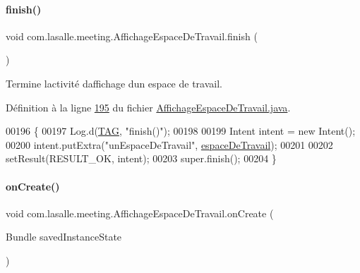 \paragraph{\texorpdfstring{finish()}{finish()}}
{\footnotesize\ttfamily void com.\+lasalle.\+meeting.\+Affichage\+Espace\+De\+Travail.\+finish (\begin{DoxyParamCaption}{ }\end{DoxyParamCaption})}



Termine l\textquotesingle{}activité d\textquotesingle{}affichage d\textquotesingle{}un espace de travail. 



Définition à la ligne \hyperlink{_affichage_espace_de_travail_8java_source_l00195}{195} du fichier \hyperlink{_affichage_espace_de_travail_8java_source}{Affichage\+Espace\+De\+Travail.\+java}.


\begin{DoxyCode}
00196     \{
00197         Log.d(\hyperlink{classcom_1_1lasalle_1_1meeting_1_1_affichage_espace_de_travail_a8606eb11c7b28f52226544de431d86a4}{TAG}, \textcolor{stringliteral}{"finish()"});
00198 
00199         Intent intent = \textcolor{keyword}{new} Intent();
00200         intent.putExtra(\textcolor{stringliteral}{"unEspaceDeTravail"}, \hyperlink{classcom_1_1lasalle_1_1meeting_1_1_affichage_espace_de_travail_a934d41c1c41882b94b65a95cee5aca13}{espaceDeTravail});
00201 
00202         setResult(RESULT\_OK, intent);
00203         super.finish();
00204     \}
\end{DoxyCode}
\mbox{\label{classcom_1_1lasalle_1_1meeting_1_1_affichage_espace_de_travail_a333ff077dde89888afc62366f6dccf06}} 
\paragraph{\texorpdfstring{on\+Create()}{onCreate()}}
{\footnotesize\ttfamily void com.\+lasalle.\+meeting.\+Affichage\+Espace\+De\+Travail.\+on\+Create (\begin{DoxyParamCaption}\item[{Bundle}]{saved\+Instance\+State }\end{DoxyParamCaption})\hspace{0.3cm}{\ttfamily [protected]}}



